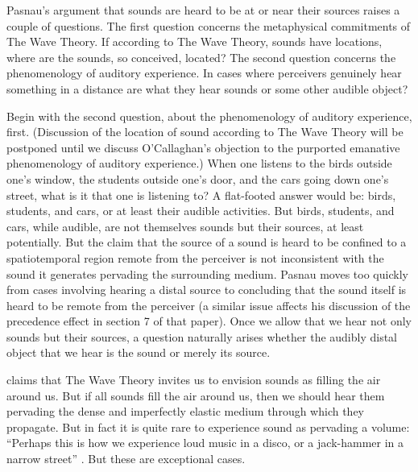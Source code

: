 Pasnau's argument that sounds are heard to be at or near their sources raises a couple of questions. The first question concerns the metaphysical commitments of The Wave Theory. If according to The Wave Theory, sounds have locations, where are the sounds, so conceived, located? The second question concerns the phenomenology of auditory experience. In cases where perceivers genuinely hear something in a distance are what they hear sounds or some other audible object? 

Begin with the second question, about the phenomenology of auditory experience, first. (Discussion of the location of sound according to The Wave Theory will be postponed until we discuss O'Callaghan's \citeyear{OCallaghan:2007xy,OCallaghan:2009aa} objection to the purported emanative phenomenology of auditory experience.) When one listens to the birds outside one's window, the students outside one's door, and the cars going down one's street, what is it that one is listening to? A flat-footed answer would be: birds, students, and cars, or at least their audible activities. But birds, students, and cars, while audible, are not themselves sounds but their sources, at least potentially. But the claim that the source of a sound is heard to be confined to a spatiotemporal region remote from the perceiver is not inconsistent with the sound it generates pervading the surrounding medium. Pasnau moves too quickly from cases involving hearing a distal source to concluding that the sound itself is heard to be remote from the perceiver (a similar issue affects his discussion of the precedence effect in section 7 of that paper). Once we allow that we hear not only sounds but their sources, a question naturally arises whether the audibly distal object that we hear is the sound or merely its source.

\citet[section 6]{Pasnau:1999ss} claims that The Wave Theory invites us to envision sounds as filling the air around us. But if all sounds fill the air around us, then we should hear them pervading the dense and imperfectly elastic medium through which they propagate. But in fact it is quite rare to experience sound as pervading a volume: ``Perhaps this is how we experience loud music in a disco, or a jack-hammer in a narrow street'' \citep[312]{Pasnau:1999ss}. But these are exceptional cases.

